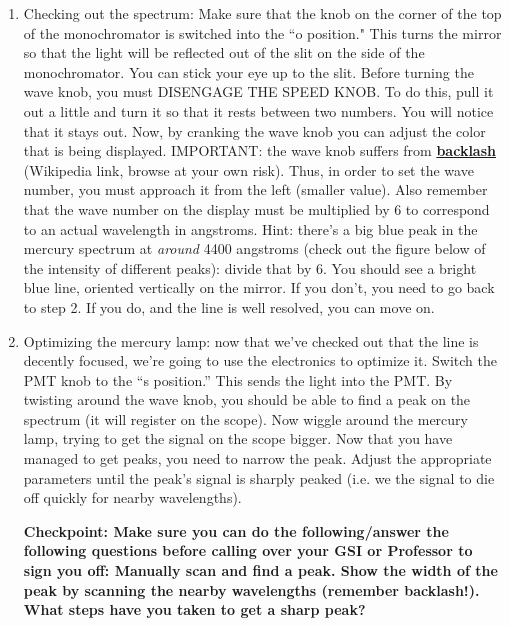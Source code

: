 \documentclass{../lab}
\begin{document}
\begin{enumerate}
    \item Checking out the spectrum:  Make sure that the knob on the corner of the top of the monochromator is switched into the ``o position." This turns the mirror so that the light will be reflected out of the slit on the side of the monochromator. You can stick your eye up to the slit. Before turning the wave knob, you must DISENGAGE THE SPEED KNOB. To do this, pull it out a little and turn it so that it rests between two numbers. You will notice that it stays out. Now, by cranking the wave knob you can adjust the color that is being displayed. IMPORTANT: the wave knob suffers from \href{https://en.wikipedia.org/wiki/Backlash\_(engineering)}{\textbf{backlash}} (Wikipedia link, browse at your own risk). Thus, in order to set the wave number, you must approach it from the left (smaller value). Also remember that the wave number on the display must be multiplied by 6 to correspond to an actual wavelength in angstroms. Hint: there's a big blue peak in the mercury spectrum at \textit{around} 4400 angstroms (check out the figure below of the intensity of different peaks): divide that by 6. You should see a bright blue line, oriented vertically on the mirror. If you don't, you need to go back to step 2. If you do, and the line is well resolved, you can move on.
    
    \item Optimizing the mercury lamp: now that we've checked out that the line is decently focused, we're going to use the electronics to optimize it. Switch the PMT knob to the ``s position.'' This sends the light into the PMT. By twisting around the wave knob, you should be able to find a peak on the spectrum (it will register on the scope). Now wiggle around the mercury lamp, trying to get the signal on the scope bigger. Now that you have managed to get peaks, you need to narrow the peak. Adjust the appropriate parameters until the peak's signal is sharply peaked (i.e. we the signal to die off quickly for nearby wavelengths).
    
    \textbf{Checkpoint: Make sure you can do the following/answer the following questions
    before calling over your GSI or Professor to sign you off: Manually scan and find a peak. Show the width of the peak by scanning the nearby wavelengths (remember backlash!). What steps have you taken to get a sharp peak?}
    

\end{enumerate}
\end{document}
